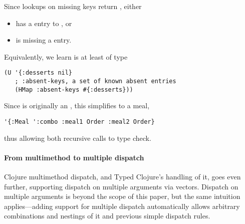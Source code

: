 Since lookups on missing keys return , either
\begin{itemize}
  \item {} has a  entry to , or
  \item {} is missing a  entry.
\end{itemize}
Equivalently, we learn  is at least of type
\begin{verbatim}
(U '{:desserts nil}
   ; :absent-keys, a set of known absent entries
   (HMap :absent-keys #{:desserts}))
\end{verbatim}
Since  is originally an , this simplifies to a  meal, 
\begin{verbatim}
'{:Meal ':combo :meal1 Order :meal2 Order}
\end{verbatim}
thus allowing both recursive calls to type check.

\paragraph{From multimethod to multiple dispatch}
Clojure multimethod dispatch, and Typed Clojure's handling of it, goes
even further, supporting dispatch on multiple arguments via vectors.
%
Dispatch on multiple arguments is beyond the scope of this paper,
but the same intuition applies---adding support for multiple dispatch
automatically allows arbitrary combinations and nestings
of it and previous simple dispatch rules.

%
%

